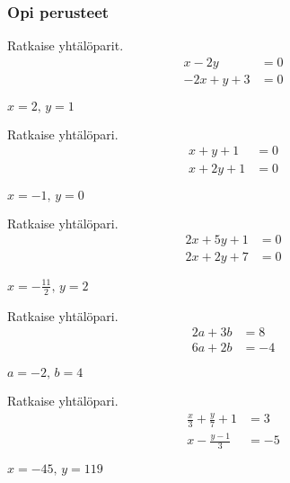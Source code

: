 \begin{tehtavasivu}

\subsubsection*{Opi perusteet}

\begin{tehtava}
    Ratkaise yhtälöparit.
    \begin{align*}
        x-2y &= 0 \\
        -2x+y+3 &=0
    \end{align*}
    \begin{vastaus}
        $x = 2, \, y = 1$
    \end{vastaus}
\end{tehtava}

\begin{tehtava}
    Ratkaise yhtälöpari.
    \begin{align*}
        x+y+1 &= 0 \\
        x+2y+1 &=0
    \end{align*}
    \begin{vastaus}
        $x = -1, \, y = 0$
    \end{vastaus}
\end{tehtava}

\begin{tehtava}
    Ratkaise yhtälöpari.
    \begin{align*}
        2x+5y+1 &= 0 \\
        2x+2y+7 &=0
    \end{align*}
    \begin{vastaus}
        $x = -\frac{11}{2}, \, y = 2$
    \end{vastaus}
\end{tehtava}

\begin{tehtava}
    Ratkaise yhtälöpari.
    \begin{align*}
        2a+3b &= 8 \\
        6a+2b &= -4
    \end{align*}
    \begin{vastaus}
        $a = -2, \, b = 4$
    \end{vastaus}
\end{tehtava}

\begin{tehtava}
    Ratkaise yhtälöpari.
    \begin{align*}
        \frac{x}{3}+\frac{y}{7} + 1 &= 3 \\
        x - \frac{y-1}{3} &= -5
    \end{align*}
    \begin{vastaus}
        $x = -45, \, y = 119$
    \end{vastaus}
\end{tehtava}


\end{tehtavasivu}
